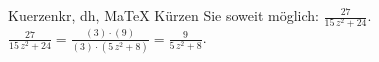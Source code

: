 \begin{MAufgabe}{Kuerzen}{kr, dh, MaTeX}
K\"urzen Sie soweit m\"oglich: $\frac{27}{15\, z^2 + 24}$.\\ 
\ifLsg\MLoesung
\quad $\frac{27}{15\, z^2 + 24}=\frac{(3)\cdot(9)}{(3)\cdot(5\, z^2 + 8)}=\frac{9}{5\, z^2 + 8}$.\else\relax\fi
 \end{MAufgabe}
